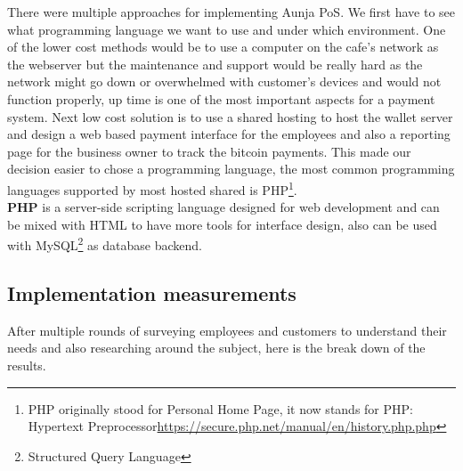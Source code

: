 There were multiple approaches for implementing Aunja PoS. We first have to see what programming language we want to use and under which environment. One of the lower cost methods would be to use a computer on the cafe's network as the webserver but the maintenance and support would be really hard as the network might go down or overwhelmed with customer's devices and would not function properly, up time is one of the most important aspects for a payment system. Next low cost solution is to use a shared hosting to host the wallet server and design a web based payment interface for the employees and also a reporting page for the business owner to track the bitcoin payments. This made our decision easier to chose a programming language, the most common programming languages supported by most hosted shared is PHP\footnote{PHP originally stood for Personal Home Page, it now stands for PHP: Hypertext Preprocessor\url{https://secure.php.net/manual/en/history.php.php}}. 
\\ \textbf{PHP} is a server-side scripting language designed for web development and can be mixed with HTML to have more tools for interface design, also can be used with MySQL\footnote{Structured Query Language} as database backend.

\subsection{Implementation measurements}
After multiple rounds of surveying employees and customers to understand their needs and also researching around the subject, here is the break down of the results.
